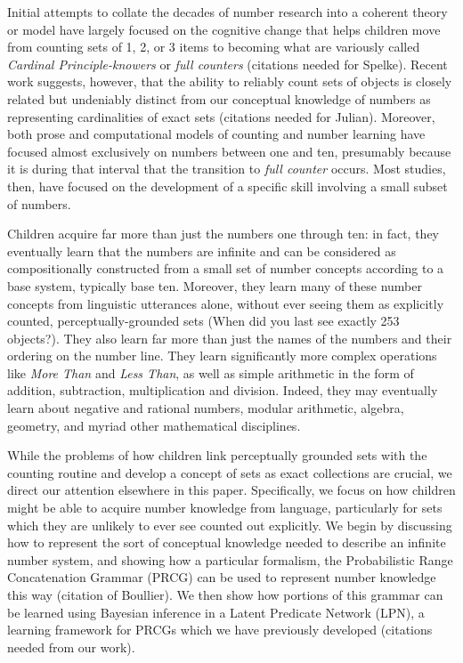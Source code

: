 \documentclass[10pt,letterpaper]{article}
\begin{document}
Initial attempts to collate the decades of number research into a
coherent theory or model have largely focused on the cognitive change
that helps children move from counting sets of 1, 2, or 3 items to
becoming what are variously called \emph{Cardinal Principle-knowers}
or \emph{full counters} \citep{Car2009,PianGoodTen2012}(citations
needed for Spelke). Recent work suggests, however, that the ability to
reliably count sets of objects is closely related but undeniably
distinct from our conceptual knowledge of numbers as representing
cardinalities of exact sets \citep{DavEngBar2012,izard2014toward}
(citations needed for Julian). Moreover, both prose and computational
models of counting and number learning have focused almost exclusively
on numbers between one and ten, presumably because it is during that
interval that the transition to \emph{full counter} occurs. Most
studies, then, have focused on the development of a specific skill
involving a small subset of numbers.

Children acquire far more than just the numbers one through ten: in
fact, they eventually learn that the numbers are infinite and can be
considered as compositionally constructed from a small set of number
concepts according to a base system, typically base ten. Moreover,
they learn many of these number concepts from linguistic utterances
alone, without ever seeing them as explicitly counted,
perceptually-grounded sets (When did you last see exactly 253
objects?). They also learn far more than just the names of the numbers
and their ordering on the number line. They learn significantly more
complex operations like \emph{More Than} and \emph{Less Than}, as well
as simple arithmetic in the form of addition, subtraction,
multiplication and division. Indeed, they may eventually learn about
negative and rational numbers, modular arithmetic, algebra, geometry,
and myriad other mathematical disciplines.

While the problems of how children link perceptually grounded sets
with the counting routine and develop a concept of sets as exact
collections are crucial, we direct our attention elsewhere in this
paper. Specifically, we focus on how children might be able to acquire
number knowledge from language, particularly for sets which they are
unlikely to ever see counted out explicitly. We begin by discussing
how to represent the sort of conceptual knowledge needed to describe
an infinite number system, and showing how a particular formalism, the
Probabilistic Range Concatenation Grammar (PRCG) can be used to
represent number knowledge this way (citation of Boullier). We then show how portions of this
grammar can be learned using Bayesian inference in a Latent Predicate
Network (LPN), a learning framework for PRCGs which we have previously
developed (citations needed from our work).
\end{document}
